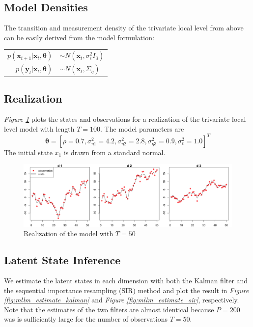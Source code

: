\documentclass[11pt, oneside]{scrreprt}   	%
\begin{document}
\subsection{Model Densities}
The transition and measurement density of the trivariate local level from above can be easily derived from the model formulation:
\begin{center}
\begin{tabular}{ r l }
  $p(\boldsymbol{x}_{t+1} | \boldsymbol{x}_t, \boldsymbol{\theta})$ & $\sim N(\boldsymbol{x}_t, \sigma_{\epsilon}^2 I_3)$ \\
  $p(\boldsymbol{y}_t | \boldsymbol{x}_t, \boldsymbol{\theta})$ & $\sim N(\boldsymbol{x}_t, \Sigma_{\eta})$ \\
\end{tabular}
\end{center}

\subsection{Realization}
\textit{Figure \ref{fig:mllm_realization}} plots the states and observations for a realization of the trivariate local level model with length $T=100$. The model parameters are 
$$
\boldsymbol{\theta} = [\rho = 0.7, \sigma_{\eta 1}^2 = 4.2, \sigma_{\eta 2}^2 = 2.8, \sigma_{\eta 3}^2 = 0.9, \sigma_{\epsilon}^2 = 1.0]^T
$$
The initial state $x_1$ is drawn from a standard normal.

\begin{figure}[h!]
\centering
\includegraphics[width=155mm]{../../images/mllm-realization-v2.png}
\caption{Realization of the model with $T=50$}
\label{fig:mllm_realization}
\end{figure}

\subsection{Latent State Inference}
We estimate the latent states in each dimension with both the Kalman filter and the sequential importance resampling (SIR) method and plot the result in \textit{Figure \ref{fig:mllm_estimate_kalman}} and \textit{Figure \ref{fig:mllm_estimate_sir}}, respectively. Note that the estimates of the two filters are almost identical because $P=200$ was is sufficiently large for the number of observations $T=50$.\\
\end{document}
